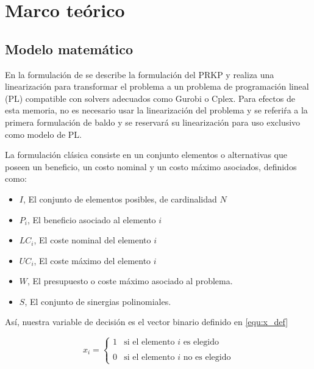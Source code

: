 \documentclass[spanish, a4paper, 12pt, twoside, openany,final]{book}
\numberwithin{equation}{section}                %
\begin{document}
\clearpage

\chapter{Marco teórico}
    \section{Modelo matemático}
    
    En la formulación de \cite{baldo_polynomial_2023} se describe la formulación del PRKP y realiza una linearización para transformar el problema a un problema de programación lineal (PL) compatible con solvers adecuados como Gurobi o Cplex. Para efectos de esta memoria, no es necesario usar la linearización del problema y se referiŕa a la primera formulación de baldo y se reservará su linearización para uso exclusivo como modelo de PL.
    
    La formulación clásica consiste en un conjunto elementos o alternativas que poseen un beneficio, un costo nominal y un costo máximo asociados, definidos como:
    
    \begin{itemize}
    	\item $I$, El conjunto de elementos posibles, de cardinalidad $N$
    	\item $P_i$, El beneficio asociado al elemento $i$ %
    	\item $LC_i$, El coste nominal del elemento $i$    %
    	\item $UC_i$, El coste máximo del elemento $i$     %
    	\item $W$, El presupuesto o coste máximo asociado al problema.
    	\item $S$, El conjunto de sinergias polinomiales.
    \end{itemize}
    
    Así, nuestra variable de decisión es el vector binario definido en \ref{equ:x_def}
    
    \begin{equation}
    	\label{equ:x_def}
    	x_i = \left\{ 
    	\begin{array}{lc}
    		1 & \text{si el elemento $i$ es elegido}\\ \\ 
    		0 &  \text{si el elemento $i$ no es elegido}
    	\end{array} \right.
    \end{equation}
    
\end{document}
